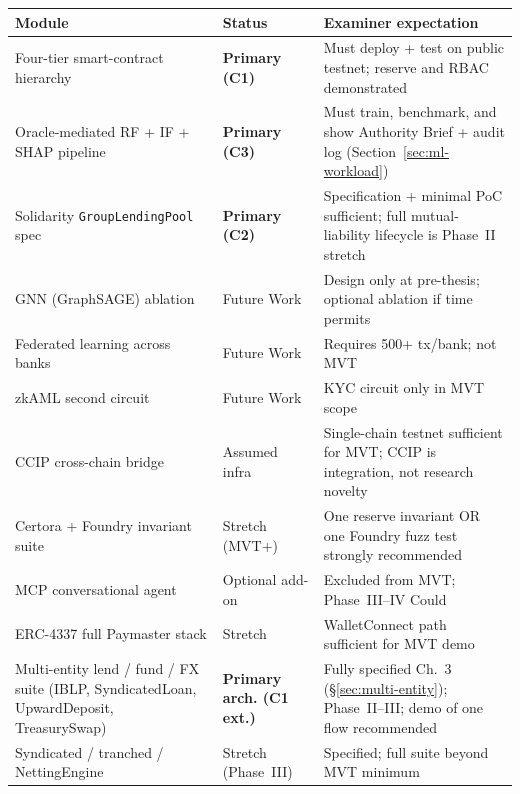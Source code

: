 \documentclass[12pt,a4paper]{report}
\newcommand{\tableheadcolor}{\rowcolor{TableHeadBg}}
\begin{document}
\begin{table}[H]
\centering
\begin{tabular}{p{4.2cm}p{2.2cm}p{7.8cm}}
\toprule
\tableheadcolor
\textbf{Module} & \textbf{Status} & \textbf{Examiner expectation} \\
\midrule
Four-tier smart-contract hierarchy & \textbf{Primary (C1)} & Must deploy + test on public testnet; reserve and RBAC demonstrated \\
Oracle-mediated RF + IF + SHAP pipeline & \textbf{Primary (C3)} & Must train, benchmark, and show Authority Brief + audit log (Section~\ref{sec:ml-workload}) \\
Solidarity \texttt{GroupLendingPool} spec & \textbf{Primary (C2)} & Specification + minimal PoC sufficient; full mutual-liability lifecycle is Phase~II stretch \\
GNN (GraphSAGE) ablation & Future Work & Design only at pre-thesis; optional ablation if time permits \\
Federated learning across banks & Future Work & Requires 500+ tx/bank; not MVT \\
zkAML second circuit & Future Work & KYC circuit only in MVT scope \\
CCIP cross-chain bridge & Assumed infra & Single-chain testnet sufficient for MVT; CCIP is integration, not research novelty \\
Certora + Foundry invariant suite & Stretch (MVT+) & One reserve invariant OR one Foundry fuzz test strongly recommended \\
MCP conversational agent & Optional add-on & Excluded from MVT; Phase~III--IV Could \\
ERC-4337 full Paymaster stack & Stretch & WalletConnect path sufficient for MVT demo \\
Multi-entity lend / fund / FX suite (IBLP, SyndicatedLoan, UpwardDeposit, TreasurySwap) & \textbf{Primary arch. (C1 ext.)} & Fully specified Ch.~3 (\S\ref{sec:multi-entity}); Phase~II--III; demo of one flow recommended \\
Syndicated / tranched / NettingEngine & Stretch (Phase~III) & Specified; full suite beyond MVT minimum \\
\bottomrule
\end{tabular}
\end{table}
\end{document}
